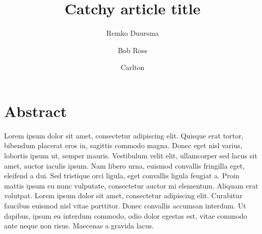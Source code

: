 \documentclass[a4paper]{article}\usepackage[]{graphicx}\usepackage[]{color}
\makeatletter
\newenvironment{kframe}{%
 \def\at@end@of@kframe{}%
 \ifinner\ifhmode%
  \def\at@end@of@kframe{\end{minipage}}%
  \begin{minipage}{\columnwidth}%
 \fi\fi%
 \def\FrameCommand##1{\hskip\@totalleftmargin \hskip-\fboxsep
 \colorbox{shadecolor}{##1}\hskip-\fboxsep
     \hskip-\linewidth \hskip-\@totalleftmargin \hskip\columnwidth}%
 \MakeFramed {\advance\hsize-\width
   \@totalleftmargin\z@ \linewidth\hsize
   \@setminipage}}%
 {\par\unskip\endMakeFramed%
 \at@end@of@kframe}
\newenvironment{knitrout}{}{} %
\makeatother
\begin{document}


\title{Catchy article title}

\author[1]{Remko Duursma}
\author[2]{Bob Ross}
\author[3]{Carlton}


\renewcommand\Authands{ and }
\maketitle



\begin{knitrout}
\color{fgcolor}\begin{kframe}


{\ttfamily\noindent\color{warningcolor}{\#\# Warning in readChar(con, 5L, useBytes = TRUE): cannot open compressed file 'tables/Table1.RData', probable reason 'No such file or directory'}}

{\ttfamily\noindent\bfseries\color{errorcolor}{\#\# Error in readChar(con, 5L, useBytes = TRUE): cannot open the connection}}\end{kframe}
\end{knitrout}




\section*{Abstract}

Lorem ipsum dolor sit amet, consectetur adipiscing elit. Quisque erat tortor, bibendum placerat eros in, sagittis commodo magna. Donec eget nisl varius, lobortis ipsum ut, semper mauris. Vestibulum velit elit, ullamcorper sed lacus sit amet, auctor iaculis ipsum. Nam libero urna, euismod convallis fringilla eget, eleifend a dui. Sed tristique orci ligula, eget convallis ligula feugiat a. Proin mattis ipsum eu nunc vulputate, consectetur auctor mi elementum. Aliquam erat volutpat. Lorem ipsum dolor sit amet, consectetur adipiscing elit. Curabitur faucibus euismod nisl vitae porttitor. Donec convallis accumsan interdum. Ut dapibus, ipsum eu interdum commodo, odio dolor egestas est, vitae commodo ante neque non risus. Maecenas a gravida lacus.
\end{document}
